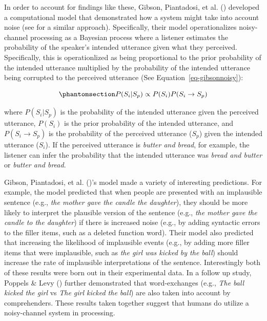 \documentclass[
  12pt,
  letterpaper,
]{scrreprt}
\begin{document}
In order to account for findings like these, Gibson, Piantadosi, et al.
()
developed a computational model that demonstrated how a system might
take into account noise (see
 for a similar
approach). Specifically, their model operationalizes noisy-channel
processing as a Bayesian process where a listener estimates the
probability of the speaker's intended utterance given what they
perceived. Specifically, this is operationlized as being proportional to
the prior probability of the intended utterance multiplied by the
probability of the intended utterance being corrupted to the perceived
utterance (See Equation~\ref{eq-gibsonnoisy}):

\begin{equation}\phantomsection\label{eq-gibsonnoisy}{
P(S_i|S_p) \propto P(S_i) P(S_i \to S_p)
}\end{equation}

\noindent where \(P(S_i|S_p)\) is the probability of the intended
utterance given the perceived utterance, \(P(S_i)\) is the prior
probability of the intended utterance, and \(P(S_i \to S_p)\) is the
probability of the perceived utterance (\(S_p\)) given the intended
utterance (\(S_i\)). If the perceived utterance is
\emph{butter and bread}, for example, the listener can infer the
probability that the intended utterance was \emph{bread and butter} or
\emph{butter and bread}.

Gibson, Piantadosi, et al.
()'s
model made a variety of interesting predictions. For example, the model
predicted that when people are presented with an implausible sentence
(e.g., \emph{the mother gave the candle the daughter}), they should be
more likely to interpret the plausible version of the sentence (e.g.,
\emph{the mother gave the candle to the
daughter}) if there is increased noise (e.g., by adding syntactic errors
to the filler items, such as a deleted function word). Their model also
predicted that increasing the likelihood of implausible events (e.g., by
adding more filler items that were implausible, such as
\emph{the girl was kicked by the ball}) should increase the rate of
implausible interpretations of the sentence. Interestingly both of these
results were born out in their experimental data. In a follow up study,
Poppels \& Levy
()
further demonstrated that word-exchanges (e.g., \emph{The
ball kicked the girl} vs \emph{The girl kicked the ball}) are also taken
into account by comprehenders. These results taken together suggest that
humans do utilize a noisy-channel system in processing.
\end{document}
